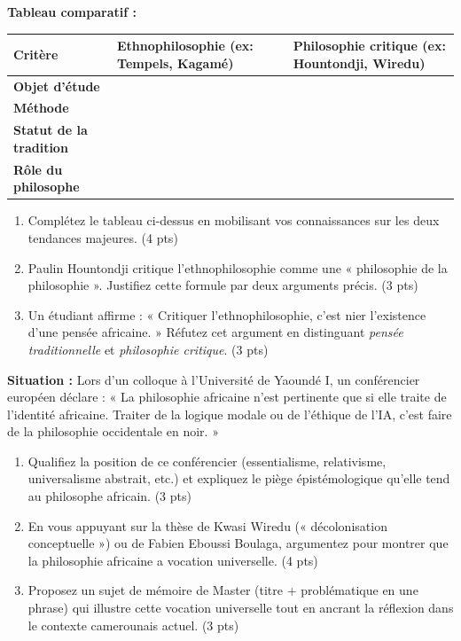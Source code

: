 \documentclass[11pt]{article}
\begin{document}
\begin{exercice}
\textbf{Tableau comparatif :}
\begin{tabularx}{\linewidth}{>{\bfseries}l X X}
\toprule
\textbf{Critère} & \textbf{Ethnophilosophie (ex: Tempels, Kagamé)} & \textbf{Philosophie critique (ex: Hountondji, Wiredu)} \\
\midrule
Objet d'étude & & \\
Méthode & & \\
Statut de la tradition & & \\
Rôle du philosophe & & \\
\bottomrule
\end{tabularx}
\begin{enumerate}
    \item Complétez le tableau ci-dessus en mobilisant vos connaissances sur les deux tendances majeures. (4 pts)
    \item Paulin Hountondji critique l'ethnophilosophie comme une « philosophie de la philosophie ». Justifiez cette formule par deux arguments précis. (3 pts)
    \item Un étudiant affirme : « Critiquer l'ethnophilosophie, c'est nier l'existence d'une pensée africaine. » Réfutez cet argument en distinguant \textit{pensée traditionnelle} et \textit{philosophie critique}. (3 pts)
\end{enumerate}
\end{exercice}

\begin{exercice}
\textbf{Situation :} Lors d'un colloque à l'Université de Yaoundé I, un conférencier européen déclare : « La philosophie africaine n'est pertinente que si elle traite de l'identité africaine. Traiter de la logique modale ou de l'éthique de l'IA, c'est faire de la philosophie occidentale en noir. »
\begin{enumerate}
    \item Qualifiez la position de ce conférencier (essentialisme, relativisme, universalisme abstrait, etc.) et expliquez le piège épistémologique qu'elle tend au philosophe africain. (3 pts)
    \item En vous appuyant sur la thèse de Kwasi Wiredu (« décolonisation conceptuelle ») ou de Fabien Eboussi Boulaga, argumentez pour montrer que la philosophie africaine a vocation universelle. (4 pts)
    \item Proposez un sujet de mémoire de Master (titre + problématique en une phrase) qui illustre cette vocation universelle tout en ancrant la réflexion dans le contexte camerounais actuel. (3 pts)
\end{enumerate}
\end{exercice}
\end{document}
